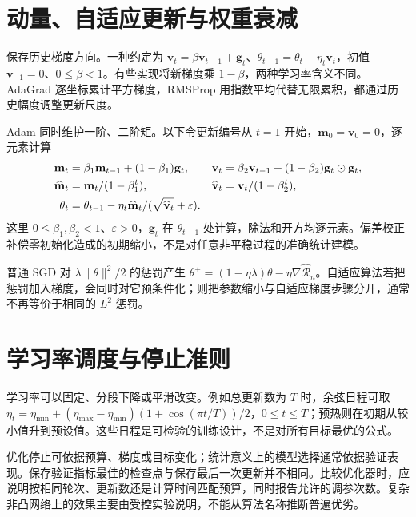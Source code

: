 \documentclass[UTF8,12pt,a4paper,fontset=fandol]{ctexbook}
\begin{document}
\section{动量、自适应更新与权重衰减}
保存历史梯度方向。一种约定为 $\mathbf v_t=\beta\mathbf v_{t-1}+\mathbf g_t$、$\theta_{t+1}=\theta_t-\eta_t\mathbf v_t$，初值 $\mathbf v_{-1}=0$、$0\leq\beta<1$。有些实现将新梯度乘 $1-\beta$，两种学习率含义不同。AdaGrad 逐坐标累计平方梯度，RMSProp 用指数平均代替无限累积，都通过历史幅度调整更新尺度。

Adam 同时维护一阶、二阶矩。以下令更新编号从 $t=1$ 开始，$\mathbf m_0=\mathbf v_0=0$，逐元素计算
\begin{align}
\mathbf m_t&=\beta_1\mathbf m_{t-1}+(1-\beta_1)\mathbf g_t,&
\mathbf v_t&=\beta_2\mathbf v_{t-1}+(1-\beta_2)\mathbf g_t\odot\mathbf g_t,\notag\\
\widehat{\mathbf m}_t&=\mathbf m_t/(1-\beta_1^t),&
\widehat{\mathbf v}_t&=\mathbf v_t/(1-\beta_2^t),\notag\\
\theta_t&=\theta_{t-1}-\eta_t\widehat{\mathbf m}_t/(\sqrt{\widehat{\mathbf v}_t}+\varepsilon).
\label{eq:dl-adam}
\end{align}
这里 $0\leq\beta_1,\beta_2<1$、$\varepsilon>0$，$\mathbf g_t$ 在 $\theta_{t-1}$ 处计算，除法和开方均逐元素。偏差校正补偿零初始化造成的初期缩小，不是对任意非平稳过程的准确统计建模。

普通 SGD 对 $\lambda\|\theta\|^2/2$ 的惩罚产生 $\theta^+=(1-\eta\lambda)\theta-\eta\nabla\widehat{\mathcal R}_n$。自适应算法若把惩罚加入梯度，会同时对它预条件化；则把参数缩小与自适应梯度步骤分开，通常不再等价于相同的 $L^2$ 惩罚。

\section{学习率调度与停止准则}
学习率可以固定、分段下降或平滑改变。例如总更新数为 $T$ 时，余弦日程可取 $\eta_t=\eta_{\min}+(\eta_{\max}-\eta_{\min})(1+\cos(\pi t/T))/2$，$0\leq t\leq T$；预热则在初期从较小值升到预设值。这些日程是可检验的训练设计，不是对所有目标最优的公式。

优化停止可依据预算、梯度或目标变化；统计意义上的模型选择通常依据验证表现。保存验证指标最佳的检查点与保存最后一次更新并不相同。比较优化器时，应说明按相同轮次、更新数还是计算时间匹配预算，同时报告允许的调参次数。复杂非凸网络上的效果主要由受控实验说明，不能从算法名称推断普遍优劣。
\end{document}
